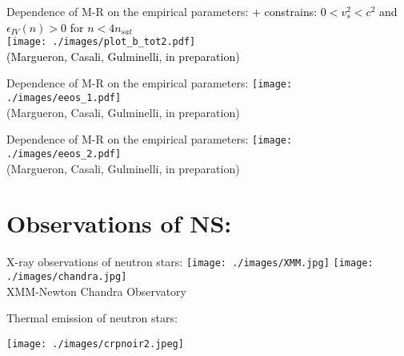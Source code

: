 \documentclass[francais]{beamer}
\begin{document}
\usebackgroundtemplate{}
\begin{frame}{Dependence of M-R on the empirical parameters:}
\textcolor{black}{+ constrains: $0<v_s^2<c^2$ and $\epsilon_{IV}(n)>0$ for $n<4n_{sat}$ }\\
\texttt{[image: ./images/plot\_b\_tot2.pdf]}\\
{\scriptsize \textcolor{black}{(Margueron, Casali, Gulminelli, in preparation)}}
\end{frame}



\begin{frame}{Dependence of M-R on the empirical parameters:}
\texttt{[image: ./images/eeos\_1.pdf]}\\
{\scriptsize (Margueron, Casali, Gulminelli, in preparation)}
\end{frame}



\begin{frame}{Dependence of M-R on the empirical parameters:}
\texttt{[image: ./images/eeos\_2.pdf]}\\
{\scriptsize (Margueron, Casali, Gulminelli, in preparation)}
\end{frame}








\section{Observations of NS:}


\begin{frame}{X-ray observations of neutron stars:}
\texttt{[image: ./images/XMM.jpg]}\hfill
\texttt{[image: ./images/chandra.jpg]}\\
XMM-Newton \hspace{+4cm} Chandra Observatory
\end{frame}


\begin{frame}{Thermal emission of neutron stars:}
\begin{center}
\texttt{[image: ./images/crpnoir2.jpeg]}
\end{center}
\end{frame}
\end{document}
